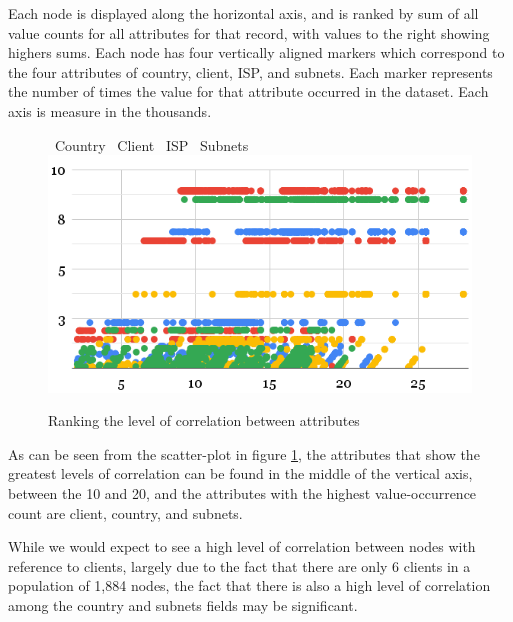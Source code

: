 \documentclass[conference]{IEEEtran}
\begin{document}
Each node is displayed along the horizontal axis, and is ranked by sum of all value counts for all attributes for that record, with values to the right showing highers sums.  Each node has four vertically aligned markers which correspond to the four attributes of country, client, ISP, and subnets.  Each marker represents the number of times the value for that attribute occurred in the dataset.  Each axis is measure in the thousands.

\vspace{6pt}

\begin{figure}[htbp]
    \centering
    \LARGE \textcolor{bluebullet}\textbullet\ \normalsize Country %
    \LARGE \textcolor{redbullet}\textbullet\ \normalsize Client %
    \LARGE \textcolor{yellowbullet}\textbullet\ \normalsize ISP %
    \LARGE \textcolor{greenbullet}\textbullet\ \normalsize Subnets
    \includegraphics[width=1\linewidth]{figures/node-correlation-ranking.png}
    \caption{Ranking the level of correlation between attributes}
    \label{fig:attribute-correlation-ranking}
\end{figure}

As can be seen from the scatter-plot in figure \ref{fig:attribute-correlation-ranking}, the attributes that show the greatest levels of correlation can be found in the middle of the vertical axis, between the 10 and 20, and the attributes with the highest value-occurrence count are client, country, and subnets.

While we would expect to see a high level of correlation between nodes with reference to clients, largely due to the fact that there are only 6 clients in a population of 1,884 nodes, the fact that there is also a high level of correlation among the country and subnets fields may be significant.
\end{document}
